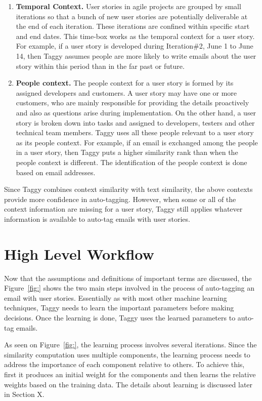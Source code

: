 \begin{enumerate}
	\item \textbf{Temporal Context.} User stories in agile projects are grouped by small iterations so that a bunch of new user stories are potentially deliverable at the end of each iteration. These iterations are confined within specific start and end dates. This time-box works as the temporal context for a user story. For example, if a user story is developed during Iteration\#2, June 1 to June 14, then Taggy assumes people are more likely to write emails about the user story within this period than in the far past or future.
	
	\item \textbf{People context.} The people context for a user story is formed by its assigned developers and customers. A user story may have one or more customers, who are mainly responsible for providing the details proactively and also as questions arise during implementation. On the other hand, a user story is broken down into tasks and assigned to developers, testers and other technical team members. Taggy uses all these people relevant to a user story as its people context. For example, if an email is exchanged among the people in a user story, then Taggy puts a higher similarity rank than when the people context is different. The identification of the people context is done based on email addresses.
\end{enumerate}

Since Taggy combines context similarity with text similarity, the above contexts provide more confidence in auto-tagging. However, when some or all of the context information are missing for a user story, Taggy still applies whatever information is available to auto-tag emails with user stories.

\section{High Level Workflow}
Now that the assumptions and definitions of important terms are discussed, the Figure~\ref{fig:} shows the two main steps involved in the process of auto-tagging an email with user stories. Essentially as with most other machine learning techniques, Taggy needs to learn the important parameters before making decisions. Once the learning is done, Taggy uses the learned parameters to auto-tag emails.

As seen on Figure~\ref{fig:}, the learning process involves several iterations. Since the similarity computation uses multiple components, the learning process needs to address the importance of each component relative to others. To achieve this, first it produces an initial weight for the components and then learns the relative weights based on the training data. The details about learning is discussed later in Section X.

